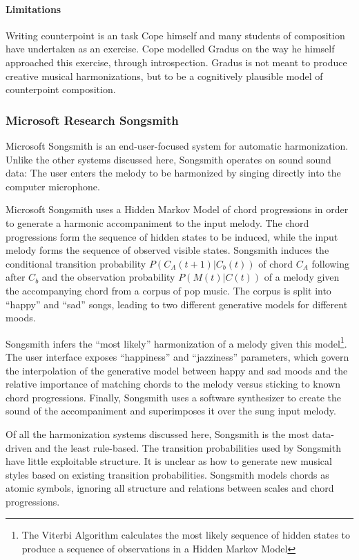 \paragraph{Limitations} 
Writing counterpoint is an task Cope himself and many students of composition have undertaken as an exercise. Cope modelled Gradus on the way he himself approached this exercise, through introspection. Gradus is not meant to produce creative musical harmonizations, but to be a cognitively plausible model of counterpoint composition.

\subsubsection{Microsoft Research Songsmith}
Microsoft Songsmith \cite{simon2008mysong} is an end-user-focused system for automatic harmonization. Unlike the other systems discussed here, Songsmith operates on sound sound data: The user enters the melody to be harmonized by singing directly into the computer microphone.

Microsoft Songsmith uses a Hidden Markov Model of chord progressions in order to generate a harmonic accompaniment to the input melody. The chord progressions form the sequence of hidden states to be induced, while the input melody forms the sequence of observed visible states. Songsmith induces the conditional transition probability $P(C_A(t+1)|C_b(t))$ of chord $C_A$ following after $C_b$ and the observation probability $P(M(t)|C(t))$ of a melody given the accompanying chord from a corpus of pop music. The corpus is split into ``happy'' and ``sad'' songs, leading to two different generative models for different moods.

Songsmith infers the ``most likely'' harmonization of a melody given this model\footnote{The Viterbi Algorithm calculates the most likely sequence of hidden states to produce a sequence of observations in a Hidden Markov Model}. The user interface exposes ``happiness'' and ``jazziness'' parameters, which govern the interpolation of the generative model between happy and sad moods and the relative importance of matching chords to the melody versus sticking to known chord progressions. Finally, Songsmith uses a software synthesizer to create the sound of the accompaniment and superimposes it over the sung input melody.

Of all the harmonization systems discussed here, Songsmith is the most data-driven and the least rule-based. The transition probabilities used by Songsmith have little exploitable structure. It is unclear as how to generate new musical styles based on existing transition probabilities. Songsmith models chords as atomic symbols, ignoring all structure and relations between scales and chord progressions.

